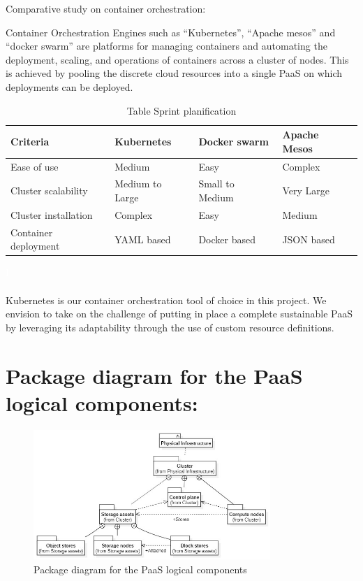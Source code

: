 \newpage
Comparative study on container orchestration: 

Container Orchestration Engines such as “Kubernetes”, “Apache mesos” and “docker swarm” are platforms for managing containers and automating the deployment, scaling, and operations of containers across a cluster of nodes. This is achieved by pooling the discrete cloud resources into a single PaaS on which deployments can be deployed. 

\begin{table}[h!]
\center
\begin{tabular}[b]{|m{3cm}|m{4cm}|m{4cm}|m{4cm}|}
\hline
Criteria & Kubernetes & Docker swarm & Apache Mesos  \\
\hline
Ease of use & Medium & Easy & Complex  \\
\hline
Cluster scalability & Medium to Large & Small to Medium & Very Large  \\
\hline
Cluster installation & Complex & Easy & Medium  \\
\hline
Container deployment & YAML based  & Docker based & JSON based \\
\hline
\end{tabular}
\caption{Table Sprint planification}
\textcolor{white}{I} \label{tab:tab-m}
\end{table}

\paragraph{}Kubernetes is our container orchestration tool of choice in this project. We envision to take on the challenge of putting in place a complete sustainable PaaS by leveraging its adaptability through the use of custom resource definitions. 


\section{Package diagram for the PaaS logical components:}

\begin{figure}[!ht]\centering
\includegraphics[width=0.8\textwidth,angle=00]{assets/f11.jpg}
\caption{Package diagram for the PaaS logical components}
\label{fig:f11}
\end{figure}



